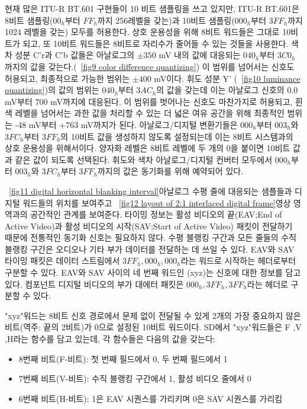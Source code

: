 현재 많은 ITU-R BT.601 구현들이 10 비트 샘플링을 쓰고 있지만, ITU-R BT.601은 8비트 샘플링($00_h$부터 $FF_h$까지 256레벨을 갖는)과 10비트 샘플링($000_h$부터 $3FF_h$까지 1024 레벨을 갖는) 모두를 허용한다.
상호 운용성을 위해 8비트 워드들은 그대로 10비트가 되고, 또 10비트 워드들은 8비트로 자리수가 줄어들 수 있는 것들을 사용한다. 색차 성분 C'r과 C'b 값들은 아날로그의 $\pm 350$ mV 내의 값에 대응되는 $040_h$부터 $3C0_h$까지의 값을 갖는다.(\figurename~\ref{fig9 color difference quantizing})
이 범위를 넘어서는 신호도 허용되고, 최종적으로 가능한 범위는 $\pm 400$ mV이다. 휘도 성분 Y' (\figurename~\ref{fig10 luminance quantizing})의 값의 범위는 $040_h$부터 $3AC_h$의 값을 갖는데 이는 아날로그 신호의 0.0 mV부터 700 mV까지에 대응된다.
이 범위를 벗어나는 신호도 마찬가지로 허용되고, 흰색 레벨을 넘어서는 과한 값을 처리할 수 있는 더 넓은 여유 공간을 위해 최종적인 범위는 -48 mV부터 +763 mV까지가 된다.
아날로그/디지털 변환기들은 $000_h$부터 $003_h$와 $3FC_h$부터 $3FF_h$의 10비트 값을 생성하지 않도록 설정되는데 이는 8비트 시스템과의 상호 운용성을 위해서이다.
양자화 레벨은 8비트 레벨에 두 개의 0을 붙이면 10비트 값과 같은 값이 되도록 선택된다. 휘도와 색차 아날로그/디지털 컨버터 모두에서 $000_h$부터 $003_h$와 $3FC_h$부터 $3FF_h$까지의 값은 동기화를 위해 예약되어 있다.

\figurename~\ref{fig11 digital horizontal blanking interval}\은 아날로그 수평 줄에 대응되는 샘플들과 디지털 워드들의 위치를 보여주고 \figurename~\ref{fig12 layout of 2:1 interlaced digital frame}\은 영상 영역과의 공간적인 관계를 보여준다.
타이밍 정보는 활성 비디오의 끝(EAV;End of Active Video)과 활성 비디오의 시작(SAV;Start of Active Video) 패킷이 전달하기 때문에 전통적인 동기화 신호는 필요하지 않다.
수평 블랭킹 구간과 모든 줄들의 수직 블랭킹 구간은 오디오나 기타 부가 데이터를 전달하는 데 쓰일 수 있다. EAV와 SAV 타이밍 패킷은 데이터 스트림에서 $3FF_h, 000_h, 000_h$라는 워드로 시작하는 헤더로부터 구분할 수 있다.
EAV와 SAV 사이의 네 번째 워드인 (xyz)는 신호에 대한 정보를 담고 있다. 컴포넌트 디지털 비디오의 부가 대에터 패킷은 $000_h, 3FF_h, 3FF_h$라는 헤더로 구분할 수 있다.

"xyz"워드는 8비트 신호 경로에서 문제 없이 전달될 수 있게 2개의 가장 중요하지 않은 비트(역주: 끝의 2비트)가 0으로 설정된 10비트 워드이다.
SD에서 "xyz"워드들은 F ,V ,H라는 함수를 담고 있는데, 각 함수들은 다음의 값을 갖는다:
\begin{itemize}
    \item 8번째 비트(F-비트): 첫 번째 필드에서 0, 두 번째 필드에서 1
    \item 7번째 비트(V-비트): 수직 블랭킹 구간에서 1, 활성 비디오 줄에서 0
    \item 6번째 비트(H-비트): 1은 EAV 시퀀스를 가리키며 0은 SAV 시퀀스를 가리킴
\end{itemize}

